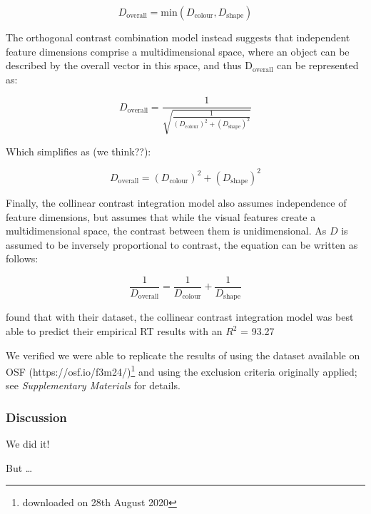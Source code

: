\documentclass[smallextended]{svjour3}       %
\begin{document}
\begin{equation}
D_\text{overall} = \text{min}\left(D_\text{colour}, D_\text{shape}\right)
\label{eq:bestfeature}
\end{equation}

The orthogonal contrast combination model instead suggests that independent feature dimensions comprise a multidimensional space, where an object can be described by the overall vector in this space, and thus $\mathrm{D_{overall}}$ can be represented as:

\begin{equation}
D_\text{overall} = \frac{1}{\sqrt{\frac{1}{(D_\text{colour})^2 + (D_\text{shape})^2}}}
\label{eq:orthogonalcontrast}
\end{equation}

Which simplifies as (we think??):

\begin{equation}
D_\text{overall} = (D_\text{colour})^2 + (D_\text{shape})^2
\label{eq:orthogonalcontrast2}
\end{equation}

Finally, the collinear contrast integration model also assumes independence of feature dimensions, but assumes that while the visual features create a multidimensional space, the contrast between them is unidimensional. As $D$ is assumed to be inversely proportional to contrast, the equation can be written as follows:

\begin{equation}
\frac{1}{D_\text{overall}} = \frac{1}{D_\text{colour}} + \frac{1}{D_\text{shape}}
\label{eq:collinearcontrast}
\end{equation}

\cite{buetti2019predicting} found that with their dataset, the collinear contrast integration model was best able to predict their empirical RT results with an $R^2$ = 93.27%

We verified we were able to replicate the results of \cite{buetti2019predicting} using the dataset available on OSF (https://osf.io/f3m24/)\footnote{downloaded on 28th August 2020} and using the exclusion criteria originally applied; see \textit{Supplementary Materials} for details.

\subsubsection{Discussion}

We did it! 

But \ldots 
\end{document}
